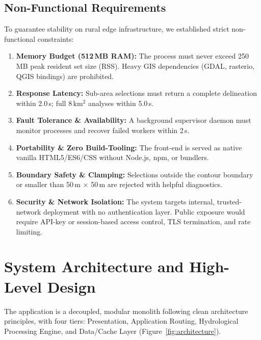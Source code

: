 \documentclass[manuscript,screen,review]{acmart}
\begin{document}
\subsection{Non-Functional Requirements}
To guarantee stability on rural edge infrastructure, we established strict non-functional constraints:
\begin{enumerate}
    \item \textbf{Memory Budget (512\,MB RAM):} The process must never exceed 250\,MB peak resident set size (RSS). Heavy GIS dependencies (GDAL, rasterio, QGIS bindings) are prohibited.
    \item \textbf{Response Latency:} Sub-area selections must return a complete delineation within 2.0\,s; full 8\,km$^2$ analyses within 5.0\,s.
    \item \textbf{Fault Tolerance \& Availability:} A background supervisor daemon must monitor processes and recover failed workers within 2\,s.
    \item \textbf{Portability \& Zero Build-Tooling:} The front-end is served as native vanilla HTML5/ES6/CSS without Node.js, npm, or bundlers.
    \item \textbf{Boundary Safety \& Clamping:} Selections outside the contour boundary or smaller than 50\,m $\times$ 50\,m are rejected with helpful diagnostics.
    \item \textbf{Security \& Network Isolation:} The system targets internal, trusted-network deployment with no authentication layer. Public exposure would require API-key or session-based access control, TLS termination, and rate limiting.
\end{enumerate}

\section{System Architecture and High-Level Design}
\label{sec:architecture}
The application is a decoupled, modular monolith following clean architecture principles, with four tiers: Presentation, Application Routing, Hydrological Processing Engine, and Data/Cache Layer (Figure~\ref{fig:architecture}).
\end{document}
